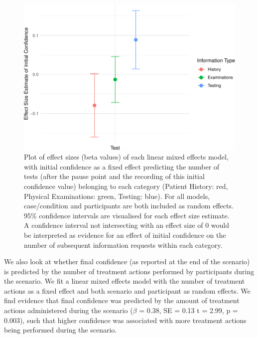 \documentclass[a4paper, nobind]{templates/ociamthesis}
\begin{document}
\begin{figure}[H]

{\centering \includegraphics[width=1\linewidth]{_main_files/figure-latex/finalconfidenceplot-1} 

}

\caption[VR Study: Effect Sizes of Initial Confidence Predicting Subseqeuent Information Seeking]{Plot of effect sizes (beta values) of each linear mixed effects model, with initial confidence as a fixed effect predicting the number of tests (after the pause point and the recording of this initial confidence value) belonging to each category (Patient History: red, Physical Examinations: green, Testing: blue). For all models, case/condition and participants are both included as random effects. 95\% confidence intervals are visualised for each effect size estimate. A confidence interval not intersecting with an effect size of 0 would be interpreted as evidence for an effect of initial confidence on the number of subsequent information requests within each category.}\label{fig:finalconfidenceplot}
\end{figure}

We also look at whether final confidence (as reported at the end of the scenario) is predicted by the number of treatment actions performed by participants during the scenario. We fit a linear mixed effects model with the number of treatment actions as a fixed effect and both scenario and participant as random effects. We find evidence that final confidence was predicted by the amount of treatment actions administered during the scenario (\(\beta\) = 0.38, SE = 0.13 t = 2.99, p = 0.003), such that higher confidence was associated with more treatment actions being performed during the scenario.
\end{document}
